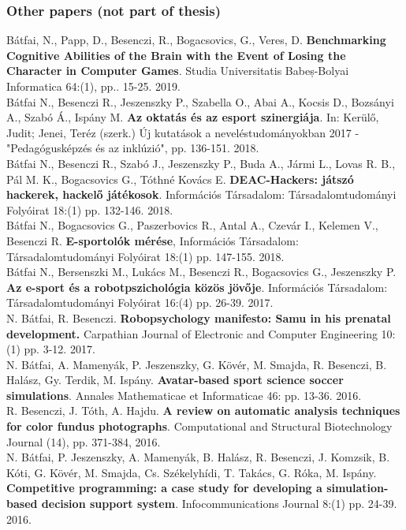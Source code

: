 \documentclass[b5paper,12pt]{report}
\theoremstyle{definition}
\begin{document}
\begin{singlespace}
\subsubsection*{Other papers (not part of thesis)}

\noindent
Bátfai, N., Papp, D., Besenczi, R., Bogacsovics, G., Veres, D. {\bf{Benchmarking Cognitive Abilities of the Brain with the Event of Losing the Character in Computer Games}}.
Studia Universitatis Babeș-Bolyai Informatica 64:(1), pp.. 15-25. 2019.
\\[10pt]
\noindent
Bátfai N., Besenczi R., Jeszenszky P., Szabella O., Abai A., Kocsis D., Bozsányi A., Szabó Á., Ispány M. {\bf{Az oktatás és az esport szinergiája}}. In: Kerülő, Judit; Jenei, Teréz (szerk.) Új kutatások a neveléstudományokban 2017 - "Pedagógusképzés és az inklúzió", pp. 136-151. 2018.
\\[10pt]
\noindent
Bátfai N., Besenczi R., Szabó J., Jeszenszky P., Buda A., Jármi L., Lovas R. B., Pál M. K., Bogacsovics G., Tóthné Kovács E. {\bf{DEAC-Hackers: játszó hackerek, hackelő játékosok}}. Információs Társadalom: Társadalomtudományi Folyóirat 18:(1) pp. 132-146. 2018.
\\[10pt]
\noindent
Bátfai N., Bogacsovics G., Paszerbovics R., Antal A., Czevár I., Kelemen V., Besenczi R. {\bf{E-sportolók mérése}}, Információs Társadalom: Társadalomtudományi Folyóirat 18:(1) pp. 147-155. 2018.
\\[10pt]
\noindent
Bátfai N., Bersenszki M., Lukács M., Besenczi R., Bogacsovics G., Jeszenszky P. {\bf{Az e-sport és a robotpszichológia közös jövője}}. Információs Társadalom: Társadalomtudományi Folyóirat 16:(4) pp. 26-39. 2017.
\\[10pt]
\noindent
N. Bátfai, R. Besenczi. {\bf{Robopsychology manifesto: Samu in his prenatal development.}} Carpathian Journal of Electronic and Computer Engineering 10:(1) pp. 3-12. 2017.
\\[10pt]
\noindent
N. Bátfai, A. Mamenyák, P. Jeszenszky, G. Kövér, M. Smajda, R. Besenczi, B. Halász, Gy. Terdik, M. Ispány. {\bf{Avatar-based sport science soccer simulations}}. Annales Mathematicae et Informaticae 46: pp. 13-36. 2016.
\\[10pt]
\noindent
R. Besenczi, J. Tóth, A. Hajdu. {\bf{A review on automatic analysis techniques for color fundus photographs}}. Computational and Structural Biotechnology Journal (14), pp. 371-384, 2016.
\\[10pt]
\noindent
N. Bátfai, P. Jeszenszky, A. Mamenyák, B. Halász, R. Besenczi, J. Komzsik, B. Kóti, G. Kövér, M. Smajda, Cs. Székelyhídi, T. Takács, G. Róka, M. Ispány. {\bf{Competitive programming: a case study for developing a simulation-based decision support system}}. Infocommunications Journal 8:(1) pp. 24-39. 2016.

\end{singlespace}
\end{document}
